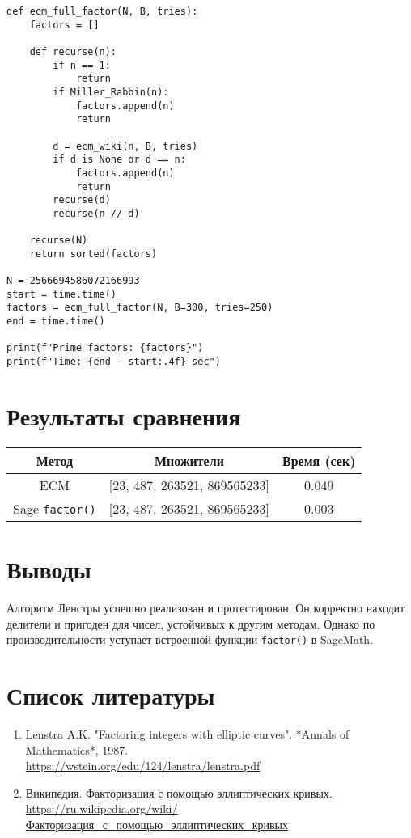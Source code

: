 \documentclass[12pt,a4paper]{article}
\begin{document}
\begin{lstlisting}
def ecm_full_factor(N, B, tries):
    factors = []

    def recurse(n):
        if n == 1:
            return
        if Miller_Rabbin(n):
            factors.append(n)
            return

        d = ecm_wiki(n, B, tries)
        if d is None or d == n:
            factors.append(n)
            return
        recurse(d)
        recurse(n // d)

    recurse(N)
    return sorted(factors)

N = 2566694586072166993
start = time.time()
factors = ecm_full_factor(N, B=300, tries=250)
end = time.time()

print(f"Prime factors: {factors}")
print(f"Time: {end - start:.4f} sec")
\end{lstlisting}

\section*{Результаты сравнения}
\begin{tabular}{|c|c|c|}
\hline
Метод & Множители & Время (сек) \\
\hline
ECM & [23, 487, 263521, 869565233] & 0.049 \\
\hline
Sage \texttt{factor()} & [23, 487, 263521, 869565233] & 0.003 \\
\hline
\end{tabular}

\section*{Выводы}
Алгоритм Ленстры успешно реализован и протестирован. Он корректно находит делители и пригоден для чисел, устойчивых к другим методам. Однако по производительности уступает встроенной функции \texttt{factor()} в SageMath.

\newpage

\section*{Список литературы}

\begin{enumerate}
    \item Lenstra A.K. "Factoring integers with elliptic curves". *Annals of Mathematics*, 1987.\\
    \url{https://wstein.org/edu/124/lenstra/lenstra.pdf}
    \item Википедия. Факторизация с помощью эллиптических кривых.\\
    \url{https://ru.wikipedia.org/wiki/Факторизация_с_помощью_эллиптических_кривых}
\end{enumerate}
\end{document}
